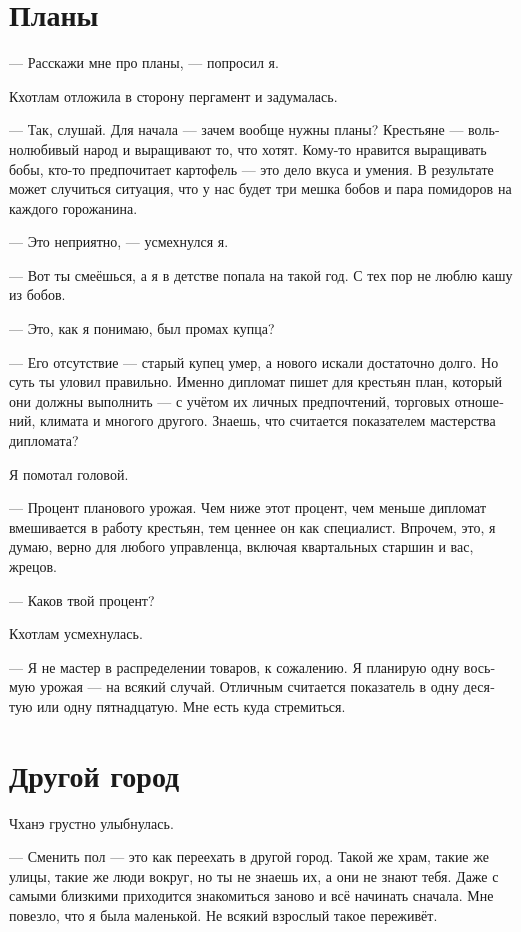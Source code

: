 \documentclass[a4paper,12pt,fleqn]{book}\usepackage{cooltooltips}\usepackage{polyglossia}\setdefaultlanguage[babelshorthands=true]{russian}\setotherlanguage{english}\defaultfontfeatures{Ligatures=TeX,Mapping=tex-text} \usepackage{xcolor}\definecolor{lightgray}{HTML}{bbbbbb}\color{lightgray}\newcommand{\ml}[3]{\textenglish{\textcolor{black}{#3}}}
\begin{document}
{\section{Планы}

--- Расскажи мне про планы, --- попросил я.

Кхотлам отложила в сторону пергамент и задумалась.

--- Так, слушай.
Для начала --- зачем вообще нужны планы?
Крестьяне --- вольнолюбивый народ и выращивают то, что хотят.
Кому-то нравится выращивать бобы, кто-то предпочитает картофель --- это дело вкуса и умения.
В результате может случиться ситуация, что у нас будет три мешка бобов и пара помидоров на каждого горожанина.

--- Это неприятно, --- усмехнулся я.

--- Вот ты смеёшься, а я в детстве попала на такой год.
С тех пор не люблю кашу из бобов.

--- Это, как я понимаю, был промах купца?

--- Его отсутствие --- старый купец умер, а нового искали достаточно долго.
Но суть ты уловил правильно.
Именно дипломат пишет для крестьян план, который они должны выполнить --- с учётом их личных предпочтений, торговых отношений, климата и многого другого.
Знаешь, что считается показателем мастерства дипломата?

Я помотал головой.

--- Процент планового урожая.
Чем ниже этот процент, чем меньше дипломат вмешивается в работу крестьян, тем ценнее он как специалист.
Впрочем, это, я думаю, верно для любого управленца, включая квартальных старшин и вас, жрецов.

--- Каков твой процент?

Кхотлам усмехнулась.

--- Я не мастер в распределении товаров, к сожалению.
Я планирую одну восьмую урожая --- на всякий случай.
Отличным считается показатель в одну десятую или одну пятнадцатую.
Мне есть куда стремиться.

\section{Другой город}

Чханэ грустно улыбнулась.

--- Сменить пол --- это как переехать в другой город.
Такой же храм, такие же улицы, такие же люди вокруг, но ты не знаешь их, а они не знают тебя.
Даже с самыми близкими приходится знакомиться заново и всё начинать сначала.
Мне повезло, что я была маленькой.
Не всякий взрослый такое переживёт.

}
\end{document}

